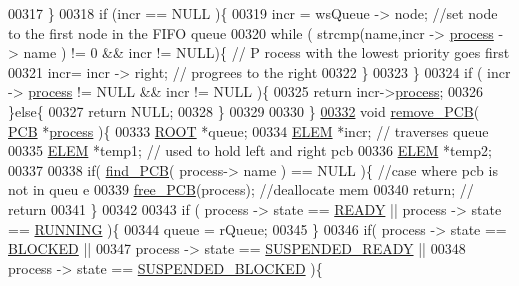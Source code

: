 \begin{DoxyCode}
{00317         \}
00318         \textcolor{keywordflow}{if} (incr == NULL )\{
00319         incr =  wsQueue -> node; \textcolor{comment}{//set node to the first node in the  FIFO queue}
00320         \textcolor{keywordflow}{while} ( strcmp(name,incr -> \hyperlink{structprocess}{process} -> name ) != 0 && incr != NULL)\{ \textcolor{comment}{// P
      rocess with the lowest priority goes first}
00321                         incr= incr -> right; \textcolor{comment}{// progrees to the right }
00322         \}
00323         \}
00324         \textcolor{keywordflow}{if} ( incr -> \hyperlink{structprocess}{process} != NULL && incr != NULL )\{
00325                 \textcolor{keywordflow}{return} incr->\hyperlink{structpage_af3cc0e1320b79159b230f154f1a95f0d}{process};
00326         \}\textcolor{keywordflow}{else}\{
00327                 \textcolor{keywordflow}{return} NULL;
00328         \}
00329 
00330 \}
\hypertarget{mpx__r2_8c_source_l00332}{}\hyperlink{mpx__r2_8c_af30a3658210d449b4b53e5be2ed2bc2e}{00332} \textcolor{keywordtype}{void} \hyperlink{mpx__r2_8c_af30a3658210d449b4b53e5be2ed2bc2e}{remove_PCB}( \hyperlink{structprocess}{PCB} *\hyperlink{structprocess}{process} )\{
00333         \hyperlink{structroot}{ROOT} *queue;
00334         \hyperlink{structpage}{ELEM} *incr; \textcolor{comment}{// traverses queue}
00335         \hyperlink{structpage}{ELEM} *temp1; \textcolor{comment}{// used to hold left and right pcb}
00336         \hyperlink{structpage}{ELEM} *temp2;
00337         
00338         \textcolor{keywordflow}{if}( \hyperlink{mpx__r2_8c_a612a6abcb66c688a32f33abc93ff3990}{find_PCB}( process-> name ) == NULL )\{ \textcolor{comment}{//case where pcb is not in queu
      e}
00339                 \hyperlink{mpx__r2_8c_a79890f055b1d0fccf1962bbde4877caa}{free_PCB}(process); \textcolor{comment}{//deallocate mem}
00340                 \textcolor{keywordflow}{return}; \textcolor{comment}{// return}
00341         \}
00342         
00343         \textcolor{keywordflow}{if} ( process -> state == \hyperlink{mpx__r2_8h_ad1235d5ce36f7267285e82dccd428aa6}{READY} || process -> state == \hyperlink{mpx__r2_8h_a6fb7181d994ee98e735494be55809708}{RUNNING} )\{
00344                 queue = rQueue;
00345         \}
00346         \textcolor{keywordflow}{if}( process -> state == \hyperlink{mpx__r2_8h_a48f6457243719e7031768d4100741159}{BLOCKED} || 
00347                 process -> state == \hyperlink{mpx__r2_8h_a07b1141143e8825b04670da23fca8cc7}{SUSPENDED_READY} || 
00348                 process -> state == \hyperlink{mpx__r2_8h_a6e41bb5a80c5049e8d364bab8ee4d73a}{SUSPENDED_BLOCKED} )\{
}
\end{DoxyCode}
